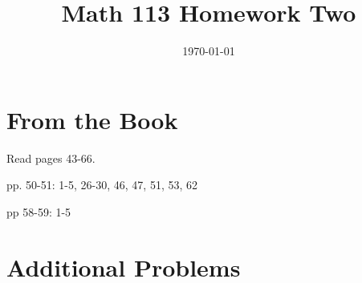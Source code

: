 \documentclass[fleqn,addpoints]{exam}
\title{Math 113 Homework Two}
\author{}
\date{\today}
\begin{document}
\maketitle





\section{From the Book}

\begin{itemize*}
\item Read pages 43-66.
\item pp. 50-51: 1-5, 26-30, 46, 47, 51, 53, 62
\item pp 58-59: 1-5
\end{itemize*}

\section{Additional Problems}
\end{document}
